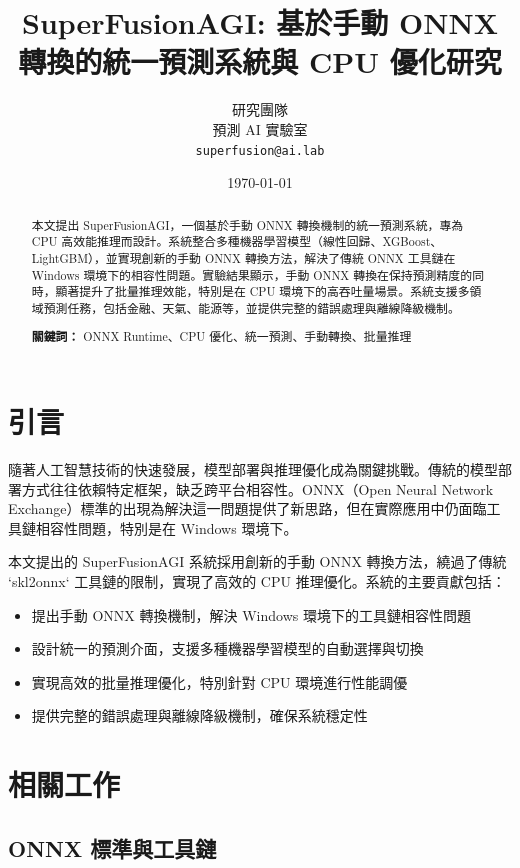 \documentclass[11pt,a4paper]{article}
\title{\textbf{SuperFusionAGI: 基於手動 ONNX 轉換的統一預測系統與 CPU 優化研究}}
\author{
    研究團隊 \\
    預測 AI 實驗室 \\
    \texttt{superfusion@ai.lab}
}
\date{\today}
\begin{document}
\maketitle

\begin{abstract}
本文提出 SuperFusionAGI，一個基於手動 ONNX 轉換機制的統一預測系統，專為 CPU 高效能推理而設計。系統整合多種機器學習模型（線性回歸、XGBoost、LightGBM），並實現創新的手動 ONNX 轉換方法，解決了傳統 ONNX 工具鏈在 Windows 環境下的相容性問題。實驗結果顯示，手動 ONNX 轉換在保持預測精度的同時，顯著提升了批量推理效能，特別是在 CPU 環境下的高吞吐量場景。系統支援多領域預測任務，包括金融、天氣、能源等，並提供完整的錯誤處理與離線降級機制。

\textbf{關鍵詞：} ONNX Runtime、CPU 優化、統一預測、手動轉換、批量推理
\end{abstract}

\section{引言}

隨著人工智慧技術的快速發展，模型部署與推理優化成為關鍵挑戰。傳統的模型部署方式往往依賴特定框架，缺乏跨平台相容性。ONNX（Open Neural Network Exchange）標準的出現為解決這一問題提供了新思路，但在實際應用中仍面臨工具鏈相容性問題，特別是在 Windows 環境下。

本文提出的 SuperFusionAGI 系統採用創新的手動 ONNX 轉換方法，繞過了傳統 `skl2onnx` 工具鏈的限制，實現了高效的 CPU 推理優化。系統的主要貢獻包括：

\begin{itemize}
    \item 提出手動 ONNX 轉換機制，解決 Windows 環境下的工具鏈相容性問題
    \item 設計統一的預測介面，支援多種機器學習模型的自動選擇與切換
    \item 實現高效的批量推理優化，特別針對 CPU 環境進行性能調優
    \item 提供完整的錯誤處理與離線降級機制，確保系統穩定性
\end{itemize}

\section{相關工作}

\subsection{ONNX 標準與工具鏈}
\end{document}
